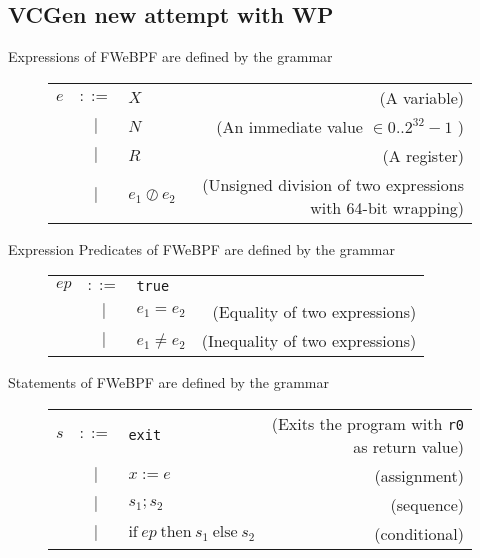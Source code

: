 \subsection{VCGen new attempt with WP}
\label{subsec:vcgen_new_attempt_with_wp}


Expressions of FWeBPF are defined by the grammar
\begin{figure}[H]
  \centering
  \begin{tabular}{lclr}
    $e$ & $::=$ & $X$ & (A variable) \\
      & $|$ & $N$ & (An immediate value $\in 0..2^{32}-1$ ) \\
      & $|$ & $R$ & (A register) \\
      & $|$ & $e_1 \oslash e_2$ & (Unsigned division of two expressions with 64-bit wrapping) \\    
\end{tabular}    
\end{figure}

Expression Predicates of FWeBPF are defined by the grammar
\begin{figure}[H]
  \centering
  \begin{tabular}{lclr}
    $ep$ & $::=$ & \texttt{true} & \\
     & $|$ & $e_1 = e_2$ & (Equality of two expressions) \\    
      & $|$ & $e_1 \neq e_2$ & (Inequality of two expressions) \\
\end{tabular}    
\end{figure}


Statements of FWeBPF are defined by the grammar
\begin{figure}[H]
  \centering
  \begin{tabular}{lclr}
    $s$ & $::=$ & \texttt{exit} & (Exits the program with \texttt{r0} as return value) \\
        & $|$   & $x := e$      & (assignment) \\
        & $|$   & $s_1 ; s_2$   & (sequence) \\
        & $|$   & $\mathrm{if} ~ ep ~ \mathrm{then} ~ s_1 ~ \mathrm{else} ~ s_2$ & (conditional) \\
\end{tabular}    
\end{figure}


